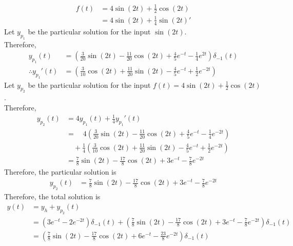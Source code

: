 \documentclass[fleqn, a4paper, 11pt, oneside]{amsart}
\theoremstyle{definition}
\theoremstyle{theorem}
\begin{document}
\begin{solution}
\begin{enumerate}[leftmargin = *]
\begin{align*}
				f(t) & = 4 \sin(2 t) + \frac{1}{2} \cos(2 t) \\
                                     & = 4 \sin(2 t) + \frac{1}{4} {\sin(2 t)}'
			\end{align*}
			Let $y_{p_1}$ be the particular solution for the input $\sin(2 t)$.\\
			Therefore,
			\begin{align*}
				y_{p_1}(t)               & = \left( \frac{3}{20} \sin(2 t) - \frac{11}{20} \cos(2 t) + \frac{4}{5} e^{-t} - \frac{1}{4} e^{2 t} \right) \delta_{-1}(t) \\
				\therefore {y_{p_1}}'(t) & = \left( \frac{3}{10} \cos(2 t) + \frac{11}{20} \sin(2 t) - \frac{4}{5} e^{-t} + \frac{1}{2} e^{-2 t} \right)
			\end{align*}
			Let $y_{p_2}$ be the particular solution for the input $f(t) = 4 \sin(2 t) + \frac{1}{2} \cos(2 t)$.\\
			Therefore,
			\begin{align*}
				y_{p_2}(t) & = 4 y_{p_1}(t) + \frac{1}{4} {y_{p_1}}'(t)                                                                                      \\
                                           & = \quad 4 \left( \frac{3}{20} \sin(2 t) - \frac{11}{20} \cos(2 t) + \frac{4}{5} e^{-t} - \frac{1}{4}e^{-2 t} \right)            \\
                                           & \quad + \frac{1}{4} \left( \frac{3}{10} \cos(2 t) + \frac{11}{20} \sin(2 t) - \frac{4}{5} e^{-t} + \frac{1}{2} e^{-2 t} \right) \\
                                           & = \frac{7}{8} \sin(2 t) - \frac{17}{8} \cos(2 t) + 3 e^{-t} - \frac{7}{8} e^{-2 t}
			\end{align*}
			Therefore, the particular solution is
			\begin{align*}
				y_{p_2}(t) & = \frac{7}{8} \sin(2 t) - \frac{17}{8} \cos(2 t) + 3 e^{-t} - \frac{7}{8} e^{-2 t}
			\end{align*}
			Therefore, the total solution is
			\begin{align*}
				y(t) & = y_h + y_{p_2}(t)                                                                                                                                                     \\
                                     & = \left( 3 e^{-t} - 2 e^{-2 t} \right) \delta_{-1}(t) + \left( \frac{7}{8} \sin(2 t) - \frac{17}{8} \cos(2 t) + 3 e^{-t} - \frac{7}{8} e^{-2 t} \right) \delta_{-1}(t) \\
                                     & = \left( \frac{7}{8} \sin(2 t) - \frac{17}{8} \cos(2 t) + 6 e^{-t} - \frac{23}{8} e^{-2 t} \right) \delta_{-1}(t)
			\end{align*}
	\end{enumerate}
\end{solution}
\end{document}
